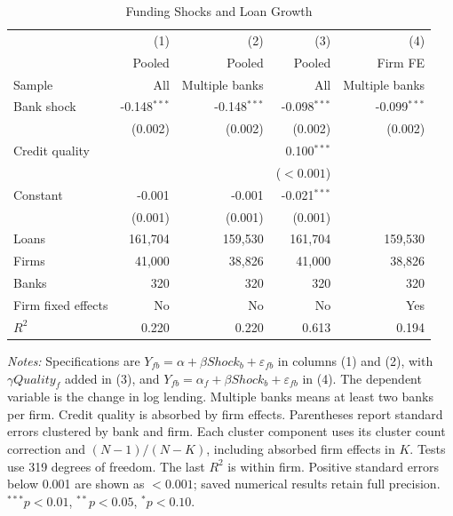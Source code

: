 \begin{table}[H]
\centering
\caption{Funding Shocks and Loan Growth}
\label{tab:q3_loan_regressions}
\small
\renewcommand{\arraystretch}{1.10}
\begin{tabular*}{\linewidth}{@{\extracolsep{\fill}}lrrrr@{}}
\toprule
 & (1) & (2) & (3) & (4) \\
 & Pooled & Pooled & Pooled & Firm FE \\
Sample & All & Multiple banks & All & Multiple banks \\
\midrule
Bank shock & -0.148$^{***}$ & -0.148$^{***}$ & -0.098$^{***}$ & -0.099$^{***}$ \\
 & (0.002) & (0.002) & (0.002) & (0.002) \\
Credit quality &  &  & 0.100$^{***}$ &  \\
 &  &  & ($<0.001$) &  \\
Constant & -0.001 & -0.001 & -0.021$^{***}$ &  \\
 & (0.001) & (0.001) & (0.001) &  \\
\midrule
Loans & 161,704 & 159,530 & 161,704 & 159,530 \\
Firms & 41,000 & 38,826 & 41,000 & 38,826 \\
Banks & 320 & 320 & 320 & 320 \\
Firm fixed effects & No & No & No & Yes \\
$R^2$ & 0.220 & 0.220 & 0.613 & 0.194 \\
\bottomrule
\end{tabular*}
\par\smallskip
\begin{minipage}{\linewidth}\footnotesize
\textit{Notes:} Specifications are $Y_{fb}=\alpha+\beta Shock_b+\varepsilon_{fb}$ in columns (1) and (2), with $\gamma Quality_f$ added in (3), and $Y_{fb}=\alpha_f+\beta Shock_b+\varepsilon_{fb}$ in (4). The dependent variable is the change in log lending. Multiple banks means at least two banks per firm. Credit quality is absorbed by firm effects. Parentheses report standard errors clustered by bank and firm. Each cluster component uses its cluster count correction and $(N-1)/(N-K)$, including absorbed firm effects in $K$. Tests use 319 degrees of freedom. The last $R^2$ is within firm. Positive standard errors below 0.001 are shown as $<0.001$; saved numerical results retain full precision. $^{***}p<0.01$, $^{**}p<0.05$, $^{*}p<0.10$.
\end{minipage}
\end{table}
